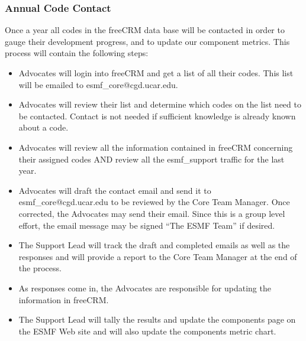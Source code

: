 \subsubsection{Annual Code Contact}
Once a year all codes in the freeCRM data base will be contacted in order to gauge 
their development progress, and to update our component metrics. This process will 
contain the following steps:
\begin{itemize}
\item Advocates will login into freeCRM and get a list of all their codes. 
This list will be emailed to esmf\_core@cgd.ucar.edu.
\item Advocates will review their list and determine which codes on the list need to be
contacted. Contact is not needed if sufficient knowledge is already known about a 
code.
\item Advocates will review all the information contained in freeCRM concerning their 
assigned codes AND review all the esmf\_support traffic for the last year.  
\item Advocates will draft the contact email and send it to esmf\_core@cgd.ucar.edu to be 
reviewed by the Core Team Manager.  Once corrected, the Advocates may send their email. Since 
this is a group level effort, the email message may be signed ``The ESMF Team'' if 
desired. 
\item The Support Lead will track the draft and completed emails as well as the 
responses and will provide a report to the Core Team Manager at the end of the 
process.  
\item As responses come in, the Advocates are responsible for updating the 
information in freeCRM.  
\item The Support Lead will tally the results and update the components page on the
ESMF Web site and will also update the components metric chart.  
\end{itemize}


